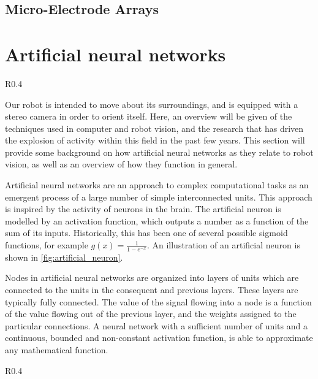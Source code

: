 \documentclass[\rootfolder/main.tex]{subfiles}
\begin{document}
\subsection{Micro-Electrode Arrays}

\section{Artificial neural networks}

\begin{wrapfigure}{R}{0.4\columnwidth}
    \caption{Model of an artificial neuron.\label{fig:artificial_neuron}}
\end{wrapfigure}

Our robot is intended to move about its surroundings, and is equipped with a stereo camera in order to orient itself.
Here, an overview will be given of the techniques used in computer and robot vision, and the research that has driven the explosion of activity within this field in the past few years.
This section will provide some background on how artificial neural networks as they relate to robot vision, as well as an overview of how they function in general.

Artificial neural networks are an approach to complex computational tasks as an emergent process of a large number of simple interconnected units.
This approach is inspired by the activity of neurons in the brain.
The artificial neuron is modelled by an activation function, which outputs a number as a function of the sum of its inputs.
Historically, this has been one of several possible sigmoid functions, for example $g\left(x\right) = \frac{1}{1 - e^{-x}}$.
An illustration of an artificial neuron is shown in \cref{fig:artificial_neuron}.

Nodes in artificial neural networks are organized into layers of units which are connected to the units in the consequent and previous layers.
These layers are typically fully connected.
The value of the signal flowing into a node is a function of the value flowing out of the previous layer, and the weights assigned to the particular connections.
A neural network with a sufficient number of units and a continuous, bounded and non-constant activation function, is able to approximate any mathematical function\cite{Cybenko1989}\cite{Hornik1991}.

\begin{wrapfigure}{R}{0.4\columnwidth}
    \caption{XOR network, illustrating how neurons can implement basic logic functions.\label{fig:xor_net}}
\end{wrapfigure}
\end{document}
